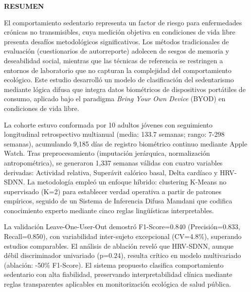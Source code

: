 \documentclass[12pt,letterpaper,oneside]{report}
\begin{document}
\newpage
{}  %
\setcounter{page}{1}
\thispagestyle{empty}

{\centering
{\fontsize{14}{16}\selectfont\bfseries RESUMEN}\\[1cm]
}

\setlength{\parindent}{1.27cm}
\onehalfspacing
\setlength{\parskip}{6pt plus 2pt minus 1pt}

El comportamiento sedentario representa un factor de riesgo para enfermedades crónicas no transmisibles, cuya medición objetiva en condiciones de vida libre presenta desafíos metodológicos significativos. Los métodos tradicionales de evaluación (cuestionarios de autorreporte) adolecen de sesgos de memoria y deseabilidad social, mientras que las técnicas de referencia se restringen a entornos de laboratorio que no capturan la complejidad del comportamiento ecológico. Este estudio desarrolló un modelo de clasificación del sedentarismo mediante lógica difusa que integra datos biométricos de dispositivos portátiles de consumo, aplicado bajo el paradigma \textit{Bring Your Own Device} (BYOD) en condiciones de vida libre.

La cohorte estuvo conformada por 10 adultos jóvenes con seguimiento longitudinal retrospectivo multianual (media: 133.7 semanas; rango: 7-298 semanas), acumulando 9,185 días de registro biométrico continuo mediante Apple Watch. Tras preprocesamiento (imputación jerárquica, normalización antropométrica), se generaron 1,337 semanas válidas con cuatro variables derivadas: Actividad relativa, Superávit calórico basal, Delta cardíaco y HRV-SDNN. La metodología empleó un enfoque híbrido: clustering K-Means no supervisado (K=2) para establecer verdad operativa a partir de patrones empíricos, seguido de un Sistema de Inferencia Difusa Mamdani que codifica conocimiento experto mediante cinco reglas lingüísticas interpretables.

La validación Leave-One-User-Out demostró F1-Score=0.840 (Precisión=0.833, Recall=0.850), con variabilidad inter-sujeto excepcional (CV=4.8\%), superando estudios comparables. El análisis de ablación reveló que HRV-SDNN, aunque débil discriminador univariado (p=0.24), resulta crítico en modelo multivariado (ablación: -50\% F1-Score). El sistema propuesto clasifica comportamiento sedentario con alta fiabilidad, preservando interpretabilidad clínica mediante reglas transparentes aplicables en monitorización ecológica de salud pública.
\end{document}
